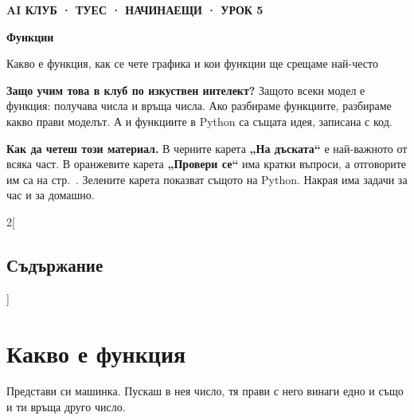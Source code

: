 \documentclass[11pt,a4paper]{article}
\begin{document}
{\small\bfseries\color{cblue} AI КЛУБ · ТУЕС · НАЧИНАЕЩИ · УРОК 5}\par\vspace{2pt}
{\fontsize{30}{34}\selectfont\bfseries Функции}\par\vspace{4pt}
{\large Какво е функция, как се чете графика и кои функции ще срещаме най-често}\par
\vspace{8pt}


\vspace{4pt}
\textbf{Защо учим това в клуб по изкуствен интелект?} Защото всеки модел е функция: получава числа и връща числа.
Ако разбираме функциите, разбираме какво прави моделът. А и функциите в Python са същата идея, записана с код.

\textbf{Как да четеш този материал.} В черните карета \textbf{„На дъската“} е най-важното от всяка част.
В оранжевите карета \textbf{„Провери се“} има кратки въпроси, а отговорите им са на стр.~\pageref{sec:answers}.
Зелените карета показват същото на Python. Накрая има задачи за час и за домашно.

\setcounter{tocdepth}{1}
{\small\setlength{\parskip}{0pt}
\raggedcolumns\begin{multicols}{2}[\subsection*{Съдържание}]
\makeatletter{}\makeatother
\end{multicols}}

\newpage
\section{Какво е функция}

Представи си машинка. Пускаш в нея число, тя прави с него винаги едно и също и ти връща друго число.
\end{document}
